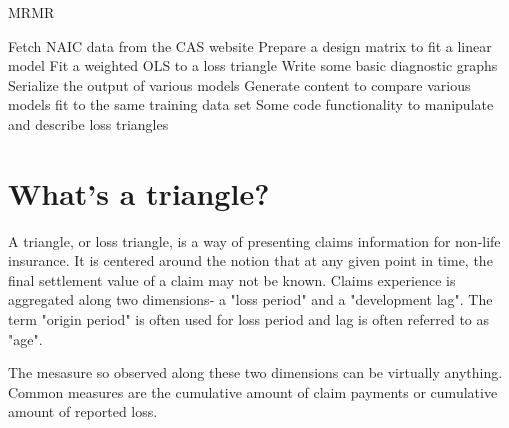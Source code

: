 MRMR

Fetch NAIC data from the CAS website
Prepare a design matrix to fit a linear model
Fit a weighted OLS to a loss triangle
Write some basic diagnostic graphs
Serialize the output of various models
Generate content to compare various models fit to the same training data set
Some code functionality to manipulate and describe loss triangles

\section{What's a triangle?}
A triangle, or loss triangle, is a way of presenting claims information for non-life insurance. It is centered around the notion that at any given point in time, the final settlement value of a claim may not be known. Claims experience is aggregated along two dimensions- a "loss period" and a "development lag". The term "origin period" is often used for loss period and lag is often referred to as "age".

The mesasure so observed along these two dimensions can be virtually anything. Common measures are the cumulative amount of claim payments or cumulative amount of reported loss.



